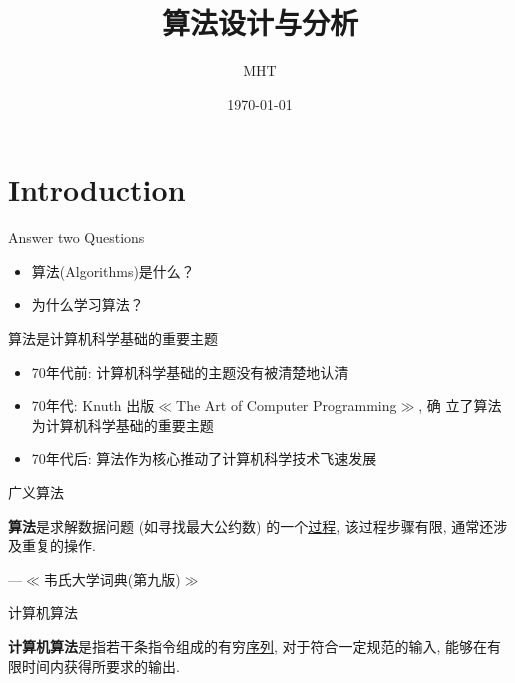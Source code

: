 \documentclass[fontset=fandol,UTF8,12pt,aspectratio=169,fleqn]{beamer}
\title{算法设计与分析}
\author{MHT}
\institute[Northeastern University at Qinhuangdao]{ }
\date{\today}
\begin{document}
\begin{frame}
  \titlepage
\end{frame}

\section{Introduction}
\begin{frame}{Answer two Questions}
  
\begin{itemize}[<+-|alert@+>]
\item 算法(Algorithms)是什么？
\item 为什么学习算法？
\end{itemize}
\end{frame}

\begin{frame}{算法是计算机科学基础的重要主题}
\begin{itemize}[<+-|alert@+>]
\item 70年代前: 计算机科学基础的主题没有被清楚地认清
\item 70年代: Knuth 出版$\ll$The Art of Computer Programming$\gg$,  确
  立了算法为计算机科学基础的重要主题
\item 70年代后: 算法作为核心推动了计算机科学技术飞速发展
\end{itemize}
\end{frame}

\begin{frame}{广义算法}
\begin{definition}
\textbf{算法}是求解数据问题 (如寻找最大公约数) 的一个\underline{过程}, 该过程步骤有限, 通常还涉及重复的操作.

  ---$\ll$韦氏大学词典(第九版)$\gg$
\end{definition}
\end{frame}

\begin{frame}{计算机算法}
  \begin{definition}
    \textbf{计算机算法}是指若干条指令组成的有穷\underline{序列}, 对于符合一定规范的输入, 能够在有限时间内获得所要求的输出.
  \end{definition}
\end{frame}
\end{document}
